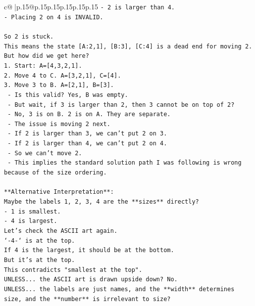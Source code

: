 \documentclass{article}
\begin{document}
{\begin{supertabular}{c@{$\;$}|p{.15\linewidth}@{}p{.15\linewidth}p{.15\linewidth}p{.15\linewidth}p{.15\linewidth}p{.15\linewidth}}
{{{\texttt{{-} 2 is larger than 4.} \\
\texttt{{-} Placing 2 on 4 is INVALID.} \\
\\ 
\texttt{So 2 is stuck.} \\
\texttt{This means the state {[}A:2,1{]}, {[}B:3{]}, {[}C:4{]} is a dead end for moving 2.} \\
\texttt{But how did we get here?} \\
\texttt{1. Start: A={[}4,3,2,1{]}.} \\
\texttt{2. Move 4 to C. A={[}3,2,1{]}, C={[}4{]}.} \\
\texttt{3. Move 3 to B. A={[}2,1{]}, B={[}3{]}.} \\
\texttt{   {-} Is this valid? Yes, B was empty.} \\
\texttt{   {-} But wait, if 3 is larger than 2, then 3 cannot be on top of 2?} \\
\texttt{   {-} No, 3 is on B. 2 is on A. They are separate.} \\
\texttt{   {-} The issue is moving 2 next.} \\
\texttt{   {-} If 2 is larger than 3, we can't put 2 on 3.} \\
\texttt{   {-} If 2 is larger than 4, we can't put 2 on 4.} \\
\texttt{   {-} So we can't move 2.} \\
\texttt{   {-} This implies the standard solution path I was following is wrong because of the size ordering.} \\
\\ 
\texttt{**Alternative Interpretation**:} \\
\texttt{Maybe the labels 1, 2, 3, 4 are the **sizes** directly?} \\
\texttt{{-} 1 is smallest.} \\
\texttt{{-} 4 is largest.} \\
\texttt{Let's check the ASCII art again.} \\
\texttt{`{-}4{-}` is at the top.} \\
\texttt{If 4 is the largest, it should be at the bottom.} \\
\texttt{But it's at the top.} \\
\texttt{This contradicts "smallest at the top".} \\
\texttt{UNLESS... the ASCII art is drawn upside down? No.} \\
\texttt{UNLESS... the labels are just names, and the **width** determines size, and the **number** is irrelevant to size?} \\
}}}
\end{supertabular}}
\end{document}
